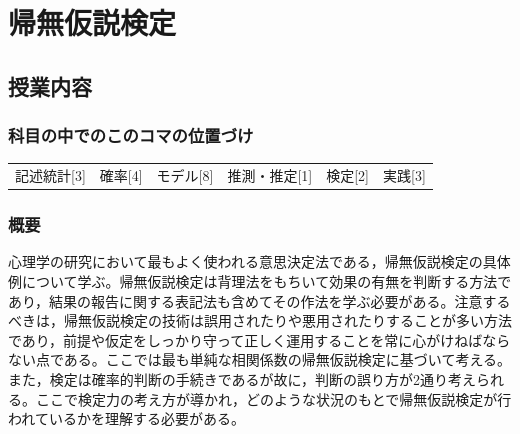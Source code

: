 \section{帰無仮説検定}
\label{s18_NHST}
\subsection{授業内容}
\subsubsection{科目の中でのこのコマの位置づけ}
\begin{tabular}[t]{cccccc}
	記述統計[3] & 確率[4] & モデル[8] & 推測・推定[1] & 検定[2] & 実践[3]
\end{tabular}
\subsubsection{概要}
心理学の研究において最もよく使われる意思決定法である，帰無仮説検定の具体例について学ぶ。帰無仮説検定は背理法をもちいて効果の有無を判断する方法であり，結果の報告に関する表記法も含めてその作法を学ぶ必要がある。注意するべきは，帰無仮説検定の技術は誤用されたりや悪用されたりすることが多い方法であり，前提や仮定をしっかり守って正しく運用することを常に心がけねばならない点である。ここでは最も単純な相関係数の帰無仮説検定に基づいて考える。また，検定は確率的判断の手続きであるが故に，判断の誤り方が2通り考えられる。ここで検定力の考え方が導かれ，どのような状況のもとで帰無仮説検定が行われているかを理解する必要がある。
